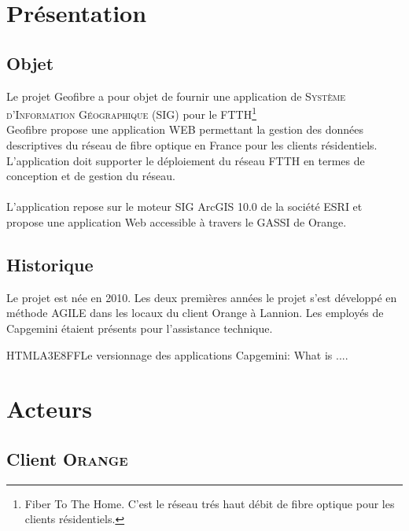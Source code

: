 \chapter{Présentation}

	\section{Objet}
Le projet Geofibre a pour objet de fournir une application de \textsc{Système d'Information Géographique (SIG)} pour le FTTH\footnote{Fiber To The Home. C'est le réseau trés haut débit de fibre optique pour les clients résidentiels.}\\
Geofibre propose une application WEB permettant la gestion des données descriptives du réseau de fibre optique en France pour les clients résidentiels.\\
L'application doit supporter le déploiement du réseau FTTH en termes de conception et de gestion du réseau. \\
\\
L'application repose sur le moteur SIG ArcGIS 10.0 de la société ESRI et propose une application Web accessible à travers le GASSI de Orange.
\begin{figure}[h]
\end{figure}
	\section{Historique}
	Le projet est née en 2010. Les deux premières années le projet s'est développé en méthode AGILE dans les locaux du client Orange à Lannion.
	Les employés de Capgemini étaient présents pour l'assistance technique.


\begin{colbox}{{HTML}{A3E8FF}}{Le versionnage des applications Capgemini: }
    What is ....
\end{colbox}


	\chapter{Acteurs}
		\section{Client \textsc{Orange}}

